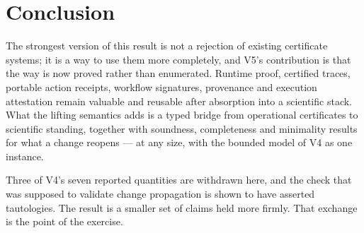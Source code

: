 \section{Conclusion}

The strongest version of this result is not a rejection of existing certificate
systems; it is a way to use them more completely, and V5's contribution is that
the way is now proved rather than enumerated. Runtime proof, certified traces,
portable action receipts, workflow signatures, provenance and execution
attestation remain valuable and reusable after absorption into a scientific
stack. What the lifting semantics adds is a typed bridge from operational
certificates to scientific standing, together with soundness, completeness and
minimality results for what a change reopens --- at any size, with the bounded
model of V4 as one instance.

Three of V4's seven reported quantities are withdrawn here, and the check that
was supposed to validate change propagation is shown to have asserted
tautologies. The result is a smaller set of claims held more firmly. That
exchange is the point of the exercise.
